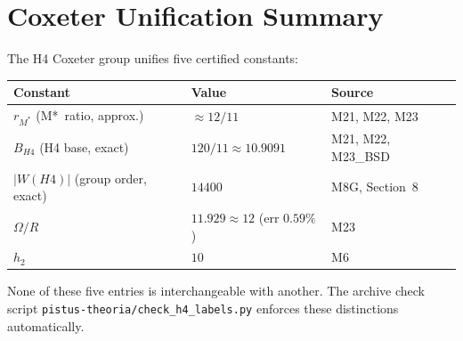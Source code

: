 \documentclass[12pt]{article}
\begin{document}
\section{Coxeter Unification Summary}

The H4 Coxeter group unifies five certified constants:
\begin{center}
\begin{tabular}{lll}
\hline
Constant & Value & Source \\
\hline
$r_{M^*}$ (M*~ratio, approx.) & $\approx 12/11$ & M21, M22, M23 \\
$B_{H4}$ (H4 base, exact)     & $120/11 \approx 10.9091$ & M21, M22, M23\_BSD \\
$|W(H4)|$ (group order, exact) & $14400$ & M8G, Section~8 \\
$\Omega/R$                     & $11.929 \approx 12$ (err $0.59\%$) & M23 \\
$h_2$                          & $10$ & M6 \\
\hline
\end{tabular}
\end{center}

\noindent
None of these five entries is interchangeable with another.  The
archive check script \texttt{pistus-theoria/check\_h4\_labels.py}
enforces these distinctions automatically.
\end{document}
